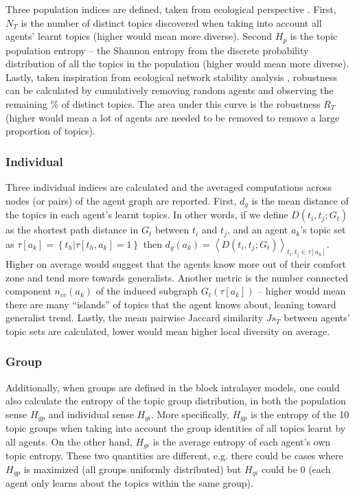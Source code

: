\documentclass{svproc}
\begin{document}
Three population indices are defined, taken from ecological perspective \cite{Tuomisto2010-pr}. First, $N_T$ is the number of distinct topics discovered when taking into account all agents' learnt topics (higher would mean more diverse). Second $H_p$ is the topic population entropy -- the Shannon entropy from the discrete probability distribution of all the topics in the population (higher would mean more diverse). Lastly, taken inspiration from ecological network stability analysis \cite{Memmott2004-os}, robustness can be calculated by cumulatively removing random agents and observing the remaining \% of distinct topics. The area under this curve is the robustness $R_T$ (higher would mean a lot of agents are needed to be removed to remove a large proportion of topics).

\vspace{-1em}
\subsubsection*{Individual}

Three individual indices are calculated and the averaged computations across nodes (or pairs) of the agent graph are reported. First, $d_g$ is the mean distance of the topics in each agent's learnt topics. In other words, if we define $D(t_i,t_j;G_t)$ as the shortest path distance in $G_t$ between $t_i$ and $t_j$, and an agent $a_k$'s topic set as $\tau[a_k] = \left\{t_h | \tau[t_h,a_k] = 1 \right\}$ then $d_g(a_k) = \left\langle D(t_i,t_j;G_t)\right\rangle_{t_i, t_j \in \tau[a_k]}$. Higher on average would suggest that the agents know more out of their comfort zone and tend more towards generalists. Another metric is the number connected component $n_{cc}(a_k)$ of the induced subgraph $G_t(\tau[a_k])$ -- higher would mean there are many ``islands'' of topics that the agent knows about, leaning toward generalist trend. Lastly, the mean pairwise Jaccard similarity $Js_T$ between agents' topic sets are calculated, lower would mean higher local diversity on average.

\vspace{-1em}
\subsubsection*{Group}

Additionally, when groups are defined in the block intralayer models, one could also calculate the entropy of the topic group distribution, in both the population sense $H_{gp}$ and individual sense $H_{gi}$. More specifically, $H_{gp}$ is the entropy of the 10 topic groups when taking into account the group identities of all topics learnt by all agents. On the other hand, $H_{gi}$ is the average entropy of each agent's own topic entropy. These two quantities are different, e.g. there could be cases where $H_{gp}$ is maximized (all groups uniformly distributed) but $H_{gi}$ could be 0 (each agent only learns about the topics within the same group).
\end{document}
